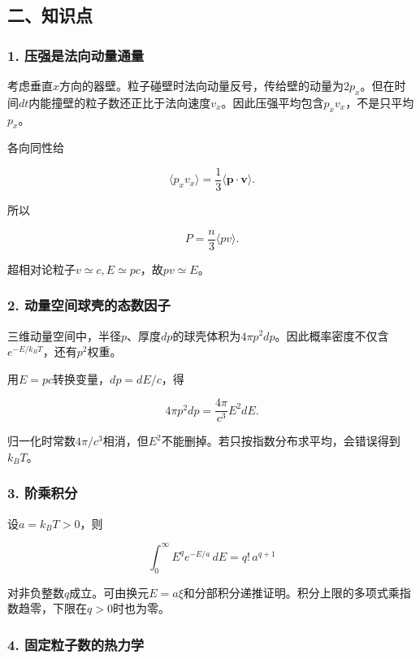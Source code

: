 \documentclass[12pt,a4paper,fontset=fandol]{ctexart}
\begin{document}
\subsection{二、知识点}\label{ux4e8cux77e5ux8bc6ux70b9-6}

\subsubsection{1.
压强是法向动量通量}\label{ux538bux5f3aux662fux6cd5ux5411ux52a8ux91cfux901aux91cf}

考虑垂直\(x\)方向的器壁。粒子碰壁时法向动量反号，传给壁的动量为\(2p_x\)。但在时间\(dt\)内能撞壁的粒子数还正比于法向速度\(v_x\)。因此压强平均包含\(p_xv_x\)，不是只平均\(p_x\)。

各向同性给

\[
\langle p_xv_x\rangle
=\frac13\langle\boldsymbol p\cdot\boldsymbol v\rangle.
\]

所以

\[
P=\frac n3\langle pv\rangle.
\]

超相对论粒子\(v\simeq c,E\simeq pc\)，故\(pv\simeq E\)。

\subsubsection{2.
动量空间球壳的态数因子}\label{ux52a8ux91cfux7a7aux95f4ux7403ux58f3ux7684ux6001ux6570ux56e0ux5b50}

三维动量空间中，半径\(p\)、厚度\(dp\)的球壳体积为\(4\pi p^2dp\)。因此概率密度不仅含\(e^{-E/k_BT}\)，还有\(p^2\)权重。

用\(E=pc\)转换变量，\(dp=dE/c\)，得

\[
4\pi p^2dp=\frac{4\pi}{c^3}E^2dE.
\]

归一化时常数\(4\pi/c^3\)相消，但\(E^2\)不能删掉。若只按指数分布求平均，会错误得到\(k_BT\)。

\subsubsection{3. 阶乘积分}\label{ux9636ux4e58ux79efux5206}

设\(a=k_BT>0\)，则

\[
\int_0^\infty E^q e^{-E/a}\,dE=q!\,a^{q+1}
\]

对非负整数\(q\)成立。可由换元\(E=a\xi\)和分部积分递推证明。积分上限的多项式乘指数趋零，下限在\(q>0\)时也为零。

\subsubsection{4.
固定粒子数的热力学}\label{ux56faux5b9aux7c92ux5b50ux6570ux7684ux70edux529bux5b66}
\end{document}

